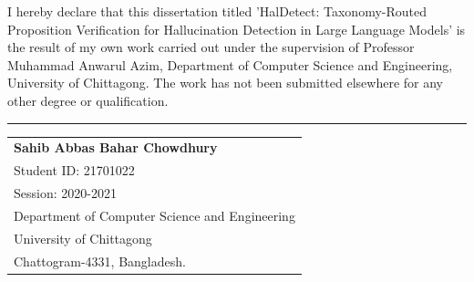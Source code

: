 
\begin{declaration}

I hereby declare that this dissertation titled 'HalDetect: Taxonomy-Routed Proposition Verification for Hallucination Detection in Large Language Models' is the result of my own work carried out under the supervision of Professor Muhammad Anwarul Azim, Department of Computer Science and Engineering, University of Chittagong. The work has not been submitted elsewhere for any other degree or qualification.

\vspace{4\baselineskip}
\begin{flushright}
\begin{minipage}[c]{0.63\textwidth}
\centering
\hrule 
\vspace{0.5\baselineskip}
\begin{tabular}{l}
\large \textbf{Sahib Abbas Bahar Chowdhury}\\
Student ID: 21701022\\
Session: 2020-2021\\
Department of Computer Science and Engineering\\
University of Chittagong\\
Chattogram-4331, Bangladesh.\\
\end{tabular}
\end{minipage}
\end{flushright}

\end{declaration}
